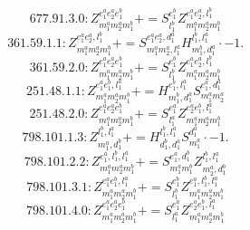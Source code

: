 \documentclass[letterpaper,10pt,fleqn,leqno,onecolumn]{article}
\begin{document}
\begin{equation} \;\;\;\;\;\;  677.91.3.0: Z^{e_{1}^{a}e_{2}^{a}e_{1}^{b}}_{m_{1}^{a}m_{2}^{a}m_{1}^{b}}+=S^{e_{1}^{b}}_{l_{1}^{b}}Z^{e_{1}^{a}e_{2}^{a},l_{1}^{b}}_{m_{1}^{a}m_{2}^{a}m_{1}^{b}} \end{equation}
\begin{equation} \;\;\;\;\;\;  361.59.1.1: Z^{e_{1}^{a}e_{2}^{a},l_{1}^{b}}_{m_{1}^{a}m_{2}^{a}m_{1}^{b}}+=S^{e_{1}^{a}e_{2}^{a},d_{1}^{a}}_{m_{1}^{a}m_{2}^{a},l_{1}^{a}}H^{l_{1}^{b},l_{1}^{a}}_{m_{1}^{b},d_{1}^{a}}\cdot -1. \end{equation}
\begin{equation} \;\;\;\;\;\;  361.59.2.0: Z^{e_{1}^{a}e_{2}^{a}e_{1}^{b}}_{m_{1}^{a}m_{2}^{a}m_{1}^{b}}+=S^{e_{1}^{b}}_{l_{1}^{b}}Z^{e_{1}^{a}e_{2}^{a},l_{1}^{b}}_{m_{1}^{a}m_{2}^{a}m_{1}^{b}} \end{equation}
\begin{equation} \;\;\;\;\;\;  251.48.1.1: Z^{e_{1}^{a}e_{1}^{b},l_{1}^{a}}_{m_{1}^{a}m_{2}^{a}m_{1}^{b}}+=H^{e_{1}^{b},l_{1}^{a}}_{m_{1}^{b},d_{1}^{a}}S^{e_{1}^{a},d_{1}^{a}}_{m_{1}^{a}m_{2}^{a}} \end{equation}
\begin{equation} \;\;\;\;\;\;  251.48.2.0: Z^{e_{1}^{a}e_{2}^{a}e_{1}^{b}}_{m_{1}^{a}m_{2}^{a}m_{1}^{b}}+=S^{e_{1}^{a}}_{l_{1}^{a}}Z^{e_{2}^{a}e_{1}^{b},l_{1}^{a}}_{m_{1}^{a}m_{2}^{a}m_{1}^{b}} \end{equation}
\begin{equation} \;\;\;\;\;\;  798.101.1.3: Z^{l_{1}^{b},l_{1}^{a}}_{m_{1}^{a},d_{1}^{b}}+=H^{l_{1}^{b},l_{1}^{a}}_{d_{1}^{b},d_{1}^{a}}S^{d_{1}^{a}}_{m_{1}^{a}}\cdot -1. \end{equation}
\begin{equation} \;\;\;\;\;\;  798.101.2.2: Z^{e_{1}^{a},l_{1}^{b},l_{1}^{a}}_{m_{1}^{a}m_{2}^{a}m_{1}^{b}}+=S^{e_{1}^{a},d_{1}^{b}}_{m_{1}^{a}m_{1}^{b}}Z^{l_{1}^{b},l_{1}^{a}}_{m_{2}^{a},d_{1}^{b}} \end{equation}
\begin{equation} \;\;\;\;\;\;  798.101.3.1: Z^{e_{1}^{a}e_{1}^{b},l_{1}^{a}}_{m_{1}^{a}m_{2}^{a}m_{1}^{b}}+=S^{e_{1}^{b}}_{l_{1}^{b}}Z^{e_{1}^{a},l_{1}^{b},l_{1}^{a}}_{m_{1}^{a}m_{2}^{a}m_{1}^{b}} \end{equation}
\begin{equation} \;\;\;\;\;\;  798.101.4.0: Z^{e_{1}^{a}e_{2}^{a}e_{1}^{b}}_{m_{1}^{a}m_{2}^{a}m_{1}^{b}}+=S^{e_{1}^{a}}_{l_{1}^{a}}Z^{e_{2}^{a}e_{1}^{b},l_{1}^{a}}_{m_{1}^{a}m_{2}^{a}m_{1}^{b}} \end{equation}
\end{document}
